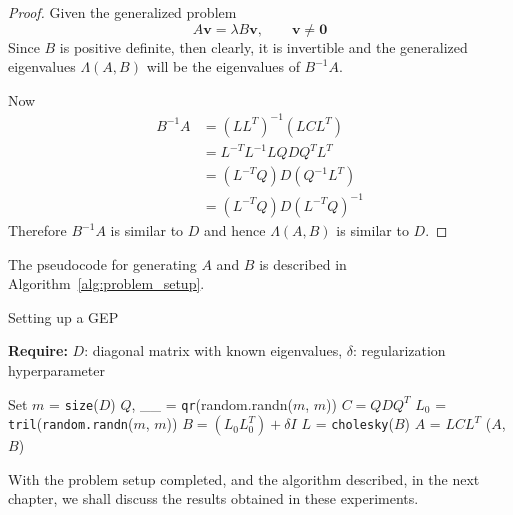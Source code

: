 \begin{proof}
	Given the generalized problem
	\begin{equation}
		A \mathbf{v} = \lambda B \mathbf{v}, \qquad \mathbf{v} \neq \mathbf{0}
	\end{equation}
	Since $B$ is positive definite, then clearly, it is invertible and the generalized eigenvalues $\Lambda(A, B)$ will be the eigenvalues of $B^{-1}A$.

	Now
	\begin{align*}
		B^{-1}A & = (LL^T)^{-1}(LCL^T)\\
		& = L^{-T}L^{-1}LQDQ^{T}L^T\\
		& = (L^{-T}Q)D(Q^{-1}L^{T}) \\
		& = (L^{-T}Q)D(L^{-T}Q)^{-1}
	\end{align*}
	Therefore $B^{-1}A$ is similar to $D$ and hence $\Lambda(A,B)$ is similar to $D$.
\end{proof}
The pseudocode for generating $A$ and $B$ is described in Algorithm~\ref{alg:problem_setup}.
\begin{algorithm}
	\caption{Setting up a GEP}
	\label{alg:problem_setup}
	
	\textbf{Require:} \( D \): diagonal matrix with known eigenvalues, \(\delta\): regularization hyperparameter
	\begin{algorithmic}[1]
		\State Set $m$ = \texttt{size}($D$)
		\State $Q$, \_\_ = \texttt{qr}(random.randn($m$, $m$))
		\State $C = QDQ^T$
		\State $L_{0}$ = \texttt{tril}(\texttt{random.randn}($m$, $m$))
		\State $B = (L_0 L_0^T) + \delta I$
		\State $L$ = \texttt{cholesky}($B$)
		\State $A$ = $LCL^T$
		\State \Return ($A$, $B$)
		\EndFunction
	\end{algorithmic}
\end{algorithm}
With the problem setup completed, and the algorithm described, in the next chapter, we shall discuss the results obtained in these experiments.


